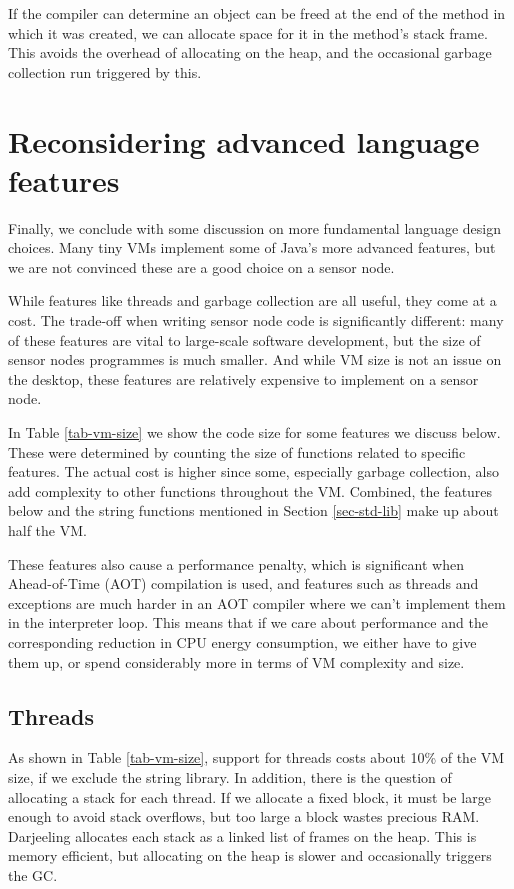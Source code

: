 If the compiler can determine an object can be freed at the end of the method in which it was created, we can allocate space for it in the method's stack frame. This avoids the overhead of allocating on the heap, and the occasional garbage collection run triggered by this.




\section{Reconsidering advanced language features}
\label{sec-advanced-features}
Finally, we conclude with some discussion on more fundamental language design choices. Many tiny VMs implement some of Java's more advanced features, but we are not convinced these are a good choice on a sensor node.

While features like threads and garbage collection are all useful, they come at a cost. The trade-off when writing sensor node code is significantly different: many of these features are vital to large-scale software development, but the size of sensor nodes programmes is much smaller. And while VM size is not an issue on the desktop, these features are relatively expensive to implement on a sensor node.

In Table \ref{tab-vm-size} we show the code size for some features we discuss below. These were determined by counting the size of functions related to specific features. The actual cost is higher since some, especially garbage collection, also add complexity to other functions throughout the VM. Combined, the features below and the string functions mentioned in Section \ref{sec-std-lib} make up about half the VM.

These features also cause a performance penalty, which is significant when Ahead-of-Time (AOT) compilation is used, and features such as threads and exceptions are much harder in an AOT compiler where we can't implement them in the interpreter loop. This means that if we care about performance and the corresponding reduction in CPU energy consumption, we either have to give them up, or spend considerably more in terms of VM complexity and size.


\subsection{Threads}
As shown in Table \ref{tab-vm-size}, support for threads costs about 10\% of the VM size, if we exclude the string library. In addition, there is the question of allocating a stack for each thread. If we allocate a fixed block, it must be large enough to avoid stack overflows, but too large a block wastes precious RAM. Darjeeling allocates each stack as a linked list of frames on the heap. This is memory efficient, but allocating on the heap is slower and occasionally triggers the GC.

